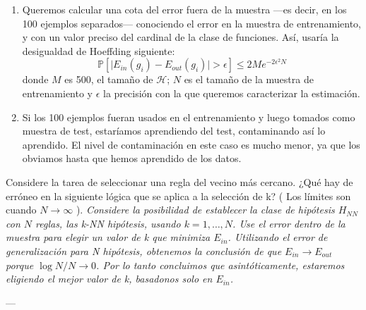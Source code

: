 \documentclass[a4paper, 11pt]{article}
\begin{document}
\begin{solucion}
      \begin{solucion}
          \begin{enumerate}
              \item Queremos calcular una cota del error fuera de la muestra ---es decir, en los 100 ejemplos separados--- conociendo el error en la muestra de entrenamiento, y con un valor preciso del cardinal de la clase de funciones. Así, usaría la desigualdad de Hoeffding siguiente:
              \[
              \mathbb{P}[\vert E_{in}(g_i) - E_{out}(g_i)\vert > \epsilon] \leq 2Me^{-2\epsilon^2N}
              \]
              donde $M$ es 500, el tamaño de $\mathcal{H}$; $N$ es el tamaño de la muestra de entrenamiento y $\epsilon$ la precisión con la que queremos caracterizar la estimación.
              \item Si los 100 ejemplos fueran usados en el entrenamiento y luego tomados como muestra de test, estaríamos aprendiendo del test, contaminando así lo aprendido. El nivel de contaminación en este caso es mucho menor, ya que los obviamos hasta que hemos aprendido de los datos.
          \end{enumerate}
      \end{solucion}

      \begin{ejercicio}
          Considere la tarea de seleccionar una regla del vecino más cercano. ¿Qué hay de erróneo en la siguiente lógica que se aplica a la selección de k? ( Los límites son cuando $N\rightarrow\infty$ ). \emph{ Considere la posibilidad de establecer la clase de hipótesis $H_{NN}$ con $N$ reglas, las k-NN hipótesis, usando $k =1,\dots,N$. Use el error dentro de la muestra para elegir un valor de k que minimiza $E_{in}$. Utilizando el error de generalización para N hipótesis, obtenemos la conclusión de que $E_{in} \rightarrow E_{out}$ porque $\log N / N \rightarrow 0$. Por lo tanto concluimos que asintóticamente,  estaremos eligiendo el mejor valor de k, basadonos solo en $E_{in}$.}
      \end{ejercicio}


      \begin{solucion}
        ---
      \end{solucion}


\end{solucion}
\end{document}
